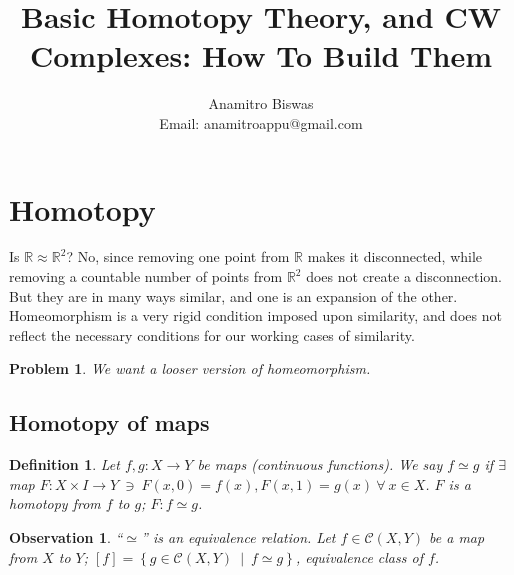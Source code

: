 \documentclass[a4paper,11pt]{article}
\newcommand{\lc}{\left\lbrace}
\newcommand{\rc}{\right\rbrace}
\newcommand{\C}{\mathcal{C}}
\newcommand{\reals}{\mathbb{R}}
\newcommand{\tends}{\rightarrow}
\newtheorem{defn}[thm]{Definition}
\newtheorem{obs}[thm]{Observation}
\newtheorem{prob}[thm]{Problem}
\begin{document}
\title{Basic Homotopy Theory, and CW Complexes: How To Build Them}
\author{Anamitro Biswas\\Email: anamitroappu@gmail.com}
\date{}
\maketitle

\section{Homotopy}
\noindent{}Is $\mathbb{R}\approx \mathbb{R}^2$? No, since removing one point from $\reals$ makes it disconnected, while removing a countable number of points from $\reals^2$ does not create a disconnection. But they are in many ways similar, and one is an expansion of the other. Homeomorphism is a very rigid condition imposed upon similarity, and does not reflect the necessary conditions for our working cases of similarity.

\begin{prob}We want a looser version of homeomorphism.
\end{prob}

\subsection{Homotopy of maps}
\begin{defn}
Let $f, g:X\tends Y$  be \textit{maps} (continuous functions). We say $f\simeq g$ if $\exists$ map $F:X\times I\tends Y~\ni~F(x,0)=f(x), F(x,1)=g(x)~\forall~x\in X$. $F$ is a homotopy from $f$ to $g$; $F:f\simeq g$.
\end{defn}

\begin{obs}``$\simeq$'' is an equivalence relation. Let $f\in\C(X, Y)$ be a map from $X$ to $Y$; $[f]=\lc g\in\C(X, Y)~\mid~f\simeq g\rc$, equivalence class of $f$.
\end{obs}
\end{document}
